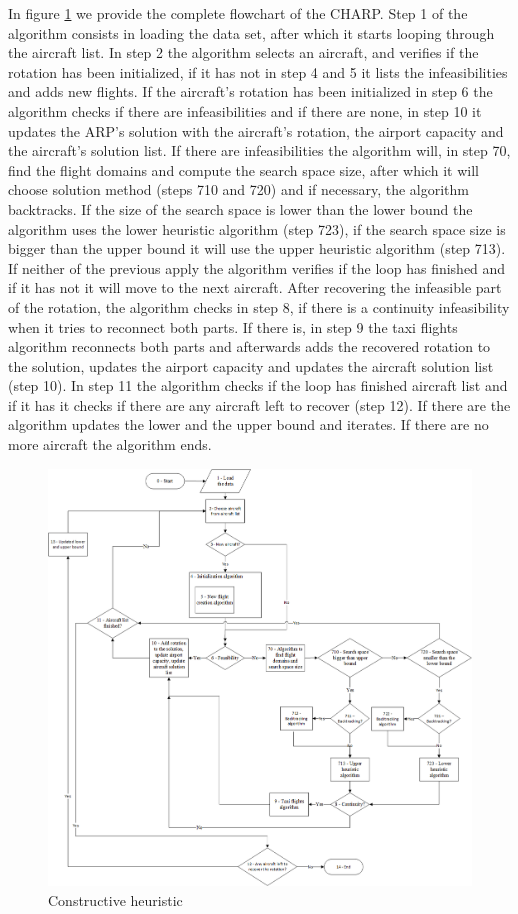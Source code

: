 In figure \ref{fig:mainAlgo} we provide the complete flowchart of the CHARP. Step 1 of the algorithm consists in loading the data set, after which it starts looping through the aircraft list. In step 2 the algorithm selects an aircraft, and verifies if the rotation has been initialized, if it has not in step 4 and 5 it lists the infeasibilities and adds new flights. If the aircraft's rotation has been initialized in step 6 the algorithm checks if there are infeasibilities and if there are none, in step 10 it updates the ARP's solution with the aircraft's rotation, the airport capacity and the aircraft's solution list. If there are infeasibilities the algorithm will, in step 70, find the flight domains and compute the search space size, after which it will choose solution method (steps 710 and 720) and if necessary, the algorithm backtracks.
If the size of the search space is lower than the lower bound the algorithm uses the lower heuristic algorithm (step 723), if the search space size is bigger than the upper bound it will use the upper heuristic algorithm (step 713). If neither of the previous apply the algorithm verifies if the loop has finished and if it has not it will move to the next aircraft. After recovering the infeasible part of the rotation, the algorithm checks in step 8, if there is a continuity infeasibility when it tries to reconnect both parts. If there is, in step 9 the taxi flights algorithm reconnects both parts and afterwards adds the recovered rotation to the solution, updates the airport capacity and updates the aircraft solution list (step 10). In step 11  the algorithm checks if the loop has finished aircraft list and if it has it checks if there are any aircraft left to recover (step 12). If there are the algorithm updates the lower and the upper bound and iterates. If there are no more aircraft the algorithm ends.

 \begin{figure}[h!]
	\centering
	\includegraphics[scale=0.65]{figures/mainAlgo.png}
	\caption[]{Constructive heuristic}
	\label{fig:mainAlgo}
\end{figure}

%
